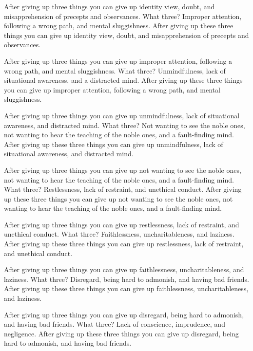 \documentclass[12pt,openany]{book}%
\begin{document}
After giving up three things you can give up identity view, doubt, and misapprehension of precepts and observances. What three? Improper attention, following a wrong path, and mental sluggishness. After giving up these three things you can give up identity view, doubt, and misapprehension of precepts and observances. 

After giving up three things you can give up improper attention, following a wrong path, and mental sluggishness. What three? Unmindfulness, lack of situational awareness, and a distracted mind. After giving up these three things you can give up improper attention, following a wrong path, and mental sluggishness. 

After giving up three things you can give up unmindfulness, lack of situational awareness, and distracted mind. What three? Not wanting to see the noble ones, not wanting to hear the teaching of the noble ones, and a fault-finding mind. After giving up these three things you can give up unmindfulness, lack of situational awareness, and distracted mind. 

After giving up three things you can give up not wanting to see the noble ones, not wanting to hear the teaching of the noble ones, and a fault-finding mind. What three? Restlessness, lack of restraint, and unethical conduct. After giving up these three things you can give up not wanting to see the noble ones, not wanting to hear the teaching of the noble ones, and a fault-finding mind. 

After giving up three things you can give up restlessness, lack of restraint, and unethical conduct. What three? Faithlessness, uncharitableness, and laziness. After giving up these three things you can give up restlessness, lack of restraint, and unethical conduct. 

After giving up three things you can give up faithlessness, uncharitableness, and laziness. What three? Disregard, being hard to admonish, and having bad friends. After giving up these three things you can give up faithlessness, uncharitableness, and laziness. 

After giving up three things you can give up disregard, being hard to admonish, and having bad friends. What three? Lack of conscience, imprudence, and negligence. After giving up these three things you can give up disregard, being hard to admonish, and having bad friends. 
\end{document}
